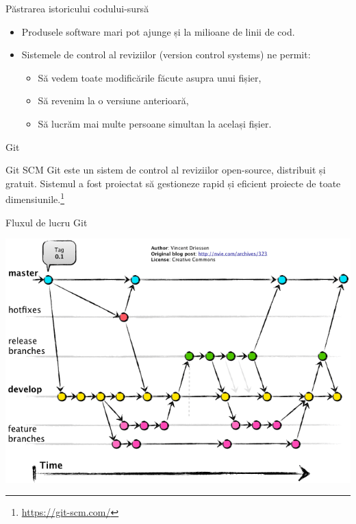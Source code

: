 \documentclass[presentation]{beamer}
\begin{document}
\begin{frame}[label={sec:orga549027}]{Păstrarea istoricului codului-sursă}
\begin{itemize}
\item Produsele software mari pot ajunge și la milioane de linii de cod.
\item Sistemele de control al reviziilor (version control systems) ne permit:
\begin{itemize}
\item Să vedem toate modificările făcute asupra unui fișier,
\item Să revenim la o versiune anterioară,
\item Să lucrăm mai multe persoane simultan la același fișier.
\end{itemize}
\end{itemize}
\end{frame}
\begin{frame}[label={sec:org80879bb}]{Git}
\begin{block}{Git SCM}
Git este un sistem de control al reviziilor open-source, distribuit și gratuit. Sistemul a fost proiectat să gestioneze rapid și eficient proiecte de toate dimensiunile.\footnote{\url{https://git-scm.com/}}
\end{block}
\end{frame}
\begin{frame}[label={sec:orgf863c23}]{Fluxul de lucru Git}
\begin{center}
\includegraphics[width=\textwidth]{img/gitflow.png}
\end{center}
\end{frame}
\end{document}
